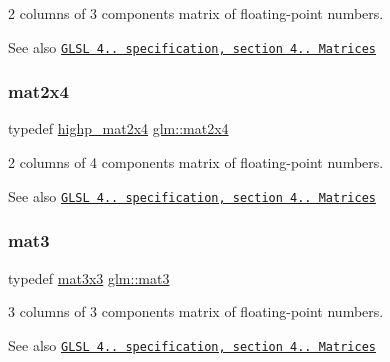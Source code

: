 2 columns of 3 components matrix of floating-\/point numbers.

\begin{DoxySeeAlso}{See also}
\href{http://www.opengl.org/registry/doc/GLSLangSpec.4.20.8.pdf}{\tt G\+L\+SL 4.. specification, section 4.. Matrices} 
\end{DoxySeeAlso}
\mbox{\label{group__core__types_gaa9bfb36efaf88ecad32369ec8a01d901}} 
\subsubsection{\texorpdfstring{mat2x4}{mat2x4}}
{\footnotesize\ttfamily typedef \hyperlink{group__core__precision_ga74ae75c71c8c2b775714fb24454d6096}{highp\+\_\+mat2x4} \hyperlink{group__core__types_gaa9bfb36efaf88ecad32369ec8a01d901}{glm\+::mat2x4}}

2 columns of 4 components matrix of floating-\/point numbers.

\begin{DoxySeeAlso}{See also}
\href{http://www.opengl.org/registry/doc/GLSLangSpec.4.20.8.pdf}{\tt G\+L\+SL 4.. specification, section 4.. Matrices} 
\end{DoxySeeAlso}
\mbox{\label{group__core__types_gadfaff2a7dce5cbf4e77a47ecea42ac5b}} 
\subsubsection{\texorpdfstring{mat3}{mat3}}
{\footnotesize\ttfamily typedef \hyperlink{group__core__types_ga6fecca6a869070b6bf8acb44ce1c2af3}{mat3x3} \hyperlink{group__core__types_gadfaff2a7dce5cbf4e77a47ecea42ac5b}{glm\+::mat3}}

3 columns of 3 components matrix of floating-\/point numbers.

\begin{DoxySeeAlso}{See also}
\href{http://www.opengl.org/registry/doc/GLSLangSpec.4.20.8.pdf}{\tt G\+L\+SL 4.. specification, section 4.. Matrices} 
\end{DoxySeeAlso}
\mbox{\label{group__core__types_gad7476e0e866186f12ee87975c6b01552}} 
